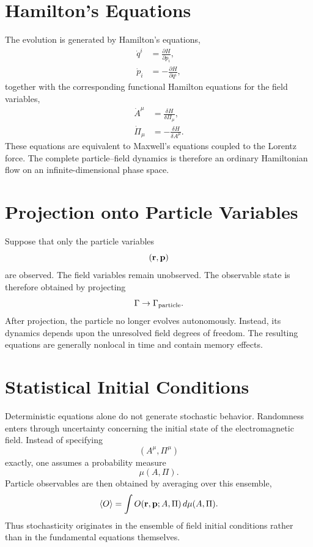 \section{Hamilton's Equations}
The evolution is generated by Hamilton's equations,
\begin{align}
\dot q^i&=\frac{\partial H}{\partial p_i},\\
\dot p_i&=-\frac{\partial H}{\partial q^i},
\end{align}
together with the corresponding functional Hamilton equations for the
field variables,
\begin{align}
\dot A^\mu&=\frac{\delta H}{\delta\Pi_\mu},\\
\dot\Pi_\mu&=-\frac{\delta H}{\delta A^\mu}.
\end{align}
These equations are equivalent to Maxwell's equations coupled to the
Lorentz force.
The complete particle--field dynamics is therefore an ordinary
Hamiltonian flow on an infinite-dimensional phase space.
\section{Projection onto Particle Variables}
Suppose that only the particle variables
\[({\bf r},{\bf p})\]
are observed.
The field variables remain unobserved.
The observable state is therefore obtained by projecting
\[\Gamma\rightarrow\Gamma_{\rm particle}.\]
After projection,
the particle no longer evolves autonomously.
Instead,
its dynamics depends upon the unresolved field degrees of freedom.
The resulting equations are generally nonlocal in time and contain memory
effects.
\section{Statistical Initial Conditions}
Deterministic equations alone do not generate stochastic behavior.
Randomness enters through uncertainty concerning the initial state of
the electromagnetic field.
Instead of specifying
\[(A^\mu,\Pi^\mu)\]
exactly,
one assumes a probability measure
\[\mu(A,\Pi).\]
Particle observables are then obtained by averaging over this ensemble,
\begin{equation}
\langle O\rangle=\int O({\bf r},{\bf p};A,\Pi)\,d\mu(A,\Pi).
\end{equation}
Thus stochasticity originates in the ensemble of field initial
conditions rather than in the fundamental equations themselves.
